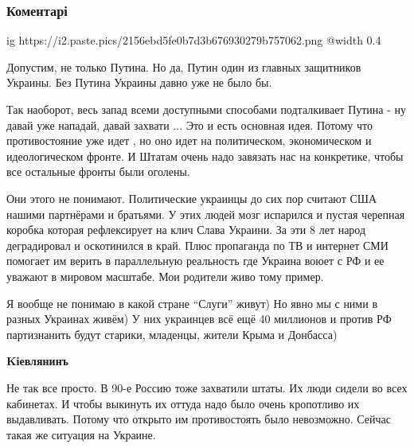  
 
 
 
 
\subsubsection{Коментарі}

\ifcmt
  ig https://i2.paste.pics/2156ebd5fe0b7d3b676930279b757062.png
  @width 0.4
\fi

\begin{itemize} %

Допустим, не только Путина. Но да, Путин один из главных защитников Украины.
Без Путина Украины давно уже не было бы.


Так наоборот, весь запад всеми доступными способами подталкивает Путина - ну
давай уже нападай, давай захвати ... Это и есть основная идея. Потому что
противостояние уже идет , но оно идет на политическом, экономическом  и
идеологическом фронте. И Штатам очень надо завязать нас на конкретике, чтобы
все остальные фронты были оголены.


Они этого не понимают. Политические украинцы до сих пор считают США нашими
партнёрами и братьями. У этих людей мозг испарился и пустая черепная коробка
которая рефлексирует на клич Слава Украини. За эти 8 лет народ деградировал и
оскотинился в край. Плюс пропаганда по ТВ и интернет СМИ помогает им верить в
параллельную реальность где Украина воюет с РФ и ее уважают в мировом масштабе.
Мои родители живо тому пример.


Я вообще не понимаю в какой стране \enquote{Слуги}  живут) Но явно мы с ними в разных
Украинах живём) У них украинцев всё ещё 40 миллионов и против РФ партизнанить
будут старики, младенцы, жители Крыма и Донбасса)

\textbf{Kіевлянинъ}

Не так все просто. В 90-е Россию тоже захватили штаты. Их люди сидели во всех
кабинетах. И чтобы выкинуть их оттуда надо было очень кропотливо их
выдавливать. Потому что открыто им противостоять было невозможно. Сейчас такая
же ситуация на Украине.


\end{itemize}

